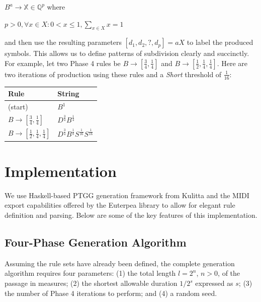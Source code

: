 \documentclass{article}
\begin{document}
$B^a \rightarrow \mathbb{X} \in \mathbb{Q}^{p}$ where 

$p > 0 , \forall x \in X: 0 < x \leq 1, \sum_{x \in X} x = 1$

and then use the resulting parameters $[d_1,d_2,?,d_p]=aX$ to label the produced symbols. This allows us to define patterns of subdivision clearly and succinctly. For example, let two Phase 4 rules be $B \rightarrow [\frac{3}{4}, \frac{1}{4}]$ and $B \rightarrow [\frac{1}{2}, \frac{1}{4}, \frac{1}{4}]$. Here are two iterations of production using these rules and a \emph{Short} threshold of $\frac{1}{16}$:

\bgroup
\def\arraystretch{1.5}
\begin{center}
\begin{tabular}{ l l }
 Rule & String \\
 \hline
 (start)                                                  & $B^{1}$ \\
 $B \rightarrow [\frac{3}{4}, \frac{1}{4}]$               & $D^{\frac{3}{4}} B^{\frac{1}{4}}$ \\
 $B \rightarrow [\frac{1}{2}, \frac{1}{4}, \frac{1}{4}]$  & $D^{\frac{3}{4}} B^{\frac{1}{8}} S^{\frac{1}{16}} S^{\frac{1}{16}}$ \\
\end{tabular}
\end{center}
\egroup


\section{Implementation}

We use Haskell-based PTGG generation framework from Kulitta and the MIDI export capabilities offered by the Euterpea library \cite{euterpea} to allow for elegant rule definition and parsing. Below are some of the key features of this implementation.

\subsection{Four-Phase Generation Algorithm}

Assuming the rule sets have already been defined, the complete generation algorithm requires four parameters: (1) the total length $l = 2^n$, $n > 0$, of the passage in measures; (2) the shortest allowable duration $1/{2^s}$ expressed as $s$; (3) the number of Phase 4 iterations to perform; and (4) a random seed.
\end{document}
